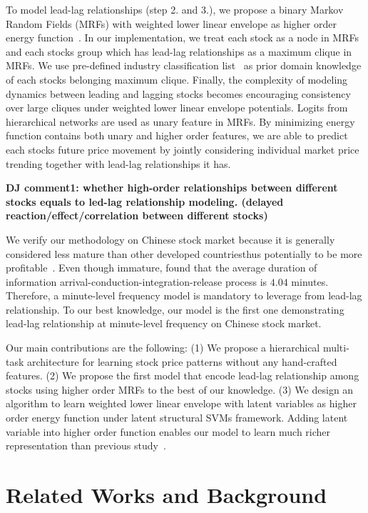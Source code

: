 \documentclass[sigconf, anonymous, review]{acmart}
\renewcommand{\citename}{\citet}
\renewcommand{\cite}{\citep}
\begin{document}
To model lead-lag relationships (step 2. and 3.), we propose a
binary Markov Random Fields (MRFs) with weighted lower linear
envelope as higher order energy
function~\cite{Kohli:CVPR07,Nowozin:2011,Gould:ICML2011,gouldlearning}.
In our implementation, we treat each stock as a node in MRFs and
each stocks group which has lead-lag relationships as a maximum
clique in MRFs. We use pre-defined industry classification
list~\cite{ths} as prior domain knowledge of each stock\textquotesingle s
belonging maximum clique. Finally, the complexity of modeling
dynamics between leading and lagging stocks becomes encouraging
consistency over large cliques under weighted lower linear
envelope potentials. Logits from hierarchical networks are used
as unary feature in MRFs. By minimizing energy function contains
both unary and higher order features, we are able to predict each
stock\textquotesingle s future price movement by jointly considering individual
market price trending together with lead-lag relationships it
has.

\textbf{DJ comment1: whether high-order relationships between different stocks equals to led-lag relationship modeling. (delayed reaction/effect/correlation between different stocks)}

We verify our methodology on Chinese stock market because
it is generally considered less mature than other developed
countries\textquotesingle thus potentially to be more
profitable~\cite{bessembinder1995profitability}. Even though
immature, \citename{fangyan2012} found that the average duration
of information arrival-conduction-integration-release process is
$4.04$ minutes. Therefore, a minute-level frequency model is
mandatory to leverage from lead-lag relationship. To our best
knowledge, our model is the first one demonstrating lead-lag
relationship at minute-level frequency on Chinese stock market.

Our main contributions are the following: (1) We propose a
hierarchical multi-task architecture for learning stock price
patterns without any hand-crafted features. (2) We propose the
first model that encode lead-lag relationship among stocks using
higher order MRFs to the best of our knowledge. (3) We design an
algorithm to learn weighted lower linear envelope with latent
variables as higher order energy function under latent structural
SVMs framework. Adding latent variable into higher order function
enables our model to learn much richer representation than
previous study~\cite{gouldlearning}.

\section{Related Works and Background}
\label{sec:background}
\end{document}
